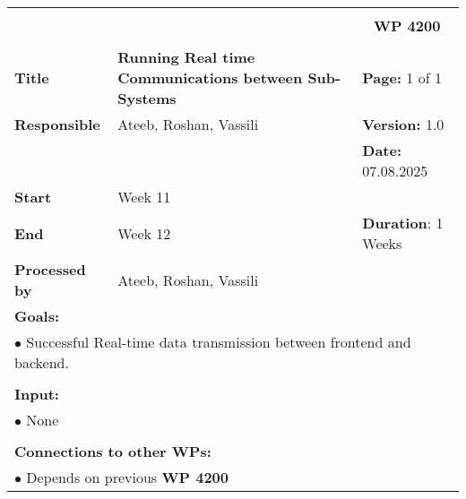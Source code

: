 \begin{table}[!h]
    \begin{center}
        \begin{tabular}{|p{}||p{}|p{}||p{}|}
            \hline
            \multicolumn{3}{|l||}{\textbf{}} & \multicolumn{1}{c|}{}\\
            \multicolumn{3}{|l||}{\textbf{}} & \multicolumn{1}{c|}{\textbf{WP 4200}}\\
            \multicolumn{3}{|l||}{\textbf{}} & \multicolumn{1}{c|}{}\\
            \hline\hline
            \textbf{Title} & \multicolumn{2}{p{.40\columnwidth}||}{\textbf{Running Real time Communications between Sub-Systems}}
            & \textbf{Page:} 1 of 1\\
            \hline
            \textbf{Responsible} & \multicolumn{2}{l||}{Ateeb, Roshan, Vassili} & \textbf{Version:} 1.0\\
            \hline
            \multicolumn{3}{|l||}{} & \textbf{Date:} 07.08.2025 \\
            \hline\hline
            \textbf{Start} & \multicolumn{2}{l||}{Week 11} & \\
            \hline
            \textbf{End} & \multicolumn{2}{l||}{Week 12} & \textbf{Duration}: 1 Weeks\\
            \hline\hline
            \textbf{Processed by} & \multicolumn{3}{l|}{Ateeb, Roshan, Vassili}\\
            \hline\hline
            \multicolumn{4}{|p{.95\columnwidth}|}{\textbf{Goals:}}\\
            \multicolumn{4}{|p{.95\columnwidth}|}{$\bullet$ Successful Real-time data transmission between frontend and backend.}\\
            \multicolumn{4}{|p{.95\columnwidth}|}{}\\
            \multicolumn{4}{|p{.95\columnwidth}|}{\textbf{Input:}}\\
            \multicolumn{4}{|p{.95\columnwidth}|}{$\bullet$ None}\\
            \multicolumn{4}{|p{.95\columnwidth}|}{}\\
            \multicolumn{4}{|p{.95\columnwidth}|}{\textbf{Connections to other WPs:}}\\
            \multicolumn{4}{|p{.95\columnwidth}|}{$\bullet$ Depends on previous \textbf{WP 4200}}\\
            

\end{tabular}
\end{center}
\end{table}
